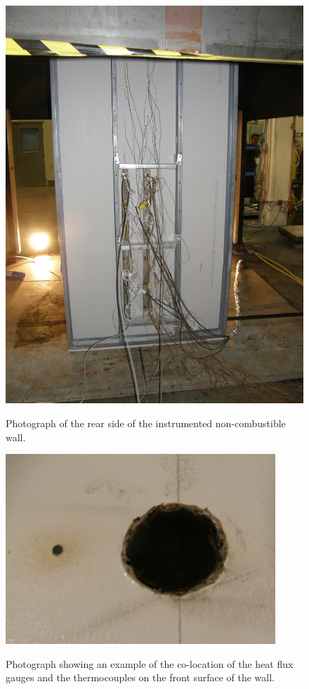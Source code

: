 \documentclass[twoside]{uocthesis}
\begin{document}
{\begin{figure}
	\centering
	\includegraphics[width=\textwidth]{../Figures/Instrumented_Wall_Rear_photo}\\
	\caption[Photograph of the rear side of the instrumented non-combustible wall]{Photograph of the rear side of the instrumented non-combustible wall.}
	\label{Instrumented_Wall_Rear_photo}
\end{figure}

\begin{figure}
	\centering
	\includegraphics[width=4.0in]{../Figures/Instrumented_Wall_Close_up_TC_HF_photo}\\
	\caption[Photograph showing an example of the co-location of the heat flux gauges and the thermocouples on the front surface of the wall.]{Photograph showing an example of the co-location of the heat flux gauges and the thermocouples on the front surface of the wall.}
	\label{Instrumented_Wall_Close_up_TC_HF_photo}
\end{figure}

}
\end{document}
